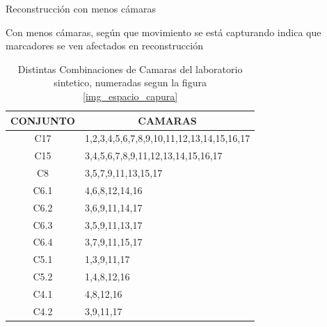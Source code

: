 Reconstrucción con menos cámaras

Con menos cámaras, según que movimiento se está capturando indica que marcadores se ven afectados en reconstrucción

\begin{table}[h]
\centering
\begin{tabular}{|c|l|}
\hline
\textbf{CONJUNTO} & \multicolumn{1}{c|}{\textbf{CAMARAS}} \\ \hline
C17 & 1,2,3,4,5,6,7,8,9,10,11,12,13,14,15,16,17 \\ \hline
C15 & 3,4,5,6,7,8,9,11,12,13,14,15,16,17 \\ \hline
C8 & 3,5,7,9,11,13,15,17 \\ \hline
C6.1 & 4,6,8,12,14,16 \\ \hline
C6.2 & 3,6,9,11,14,17 \\ \hline
C6.3 & 3,5,9,11,13,17 \\ \hline
C6.4 & 3,7,9,11,15,17 \\ \hline
C5.1 & 1,3,9,11,17 \\ \hline
C5.2 & 1,4,8,12,16 \\ \hline
C4.1 & 4,8,12,16 \\ \hline
C4.2 & 3,9,11,17 \\ \hline
\end{tabular}
\caption{Distintas Combinaciones de Camaras del laboratorio sintetico, numeradas segun la figura \ref{img_espacio_capura} }
\end{table}

